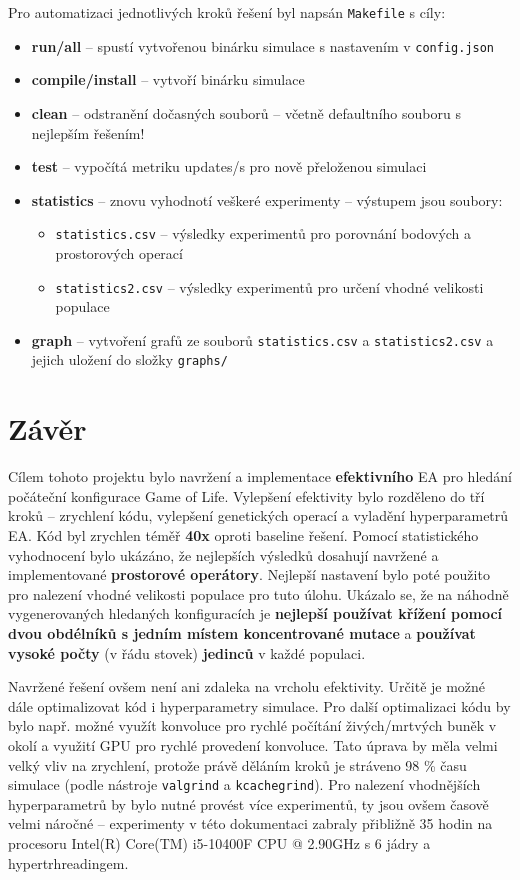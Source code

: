 \documentclass[12pt]{article}
\begin{document}
Pro automatizaci jednotlivých kroků řešení byl napsán \texttt{Makefile} s cíly:
\begin{itemize}
    \item \textbf{run/all} -- spustí vytvořenou binárku simulace s nastavením v \texttt{config.json}
    \item \textbf{compile/install} -- vytvoří binárku simulace
    \item \textbf{clean} -- odstranění dočasných souborů -- včetně defaultního souboru s nejlepším řešením!
    \item \textbf{test} -- vypočítá metriku updates/s pro nově přeloženou simulaci
    \item \textbf{statistics} -- znovu vyhodnotí veškeré experimenty -- výstupem jsou soubory:
       \begin{itemize}
           \item \texttt{statistics.csv} -- výsledky experimentů pro porovnání bodových a prostorových operací
           \item \texttt{statistics2.csv} -- výsledky experimentů pro určení vhodné velikosti populace  
       \end{itemize}
    \item \textbf{graph} -- vytvoření grafů ze souborů \texttt{statistics.csv} a  \texttt{statistics2.csv} a jejich uložení do složky \texttt{graphs/}
\end{itemize}

\section{Závěr}
Cílem tohoto projektu bylo navržení a implementace \textbf{efektivního} EA pro hledání počáteční konfigurace Game of Life. Vylepšení efektivity bylo rozděleno do tří kroků -- zrychlení kódu, vylepšení genetických operací a vyladění hyperparametrů EA. Kód byl zrychlen téměř \textbf{40x} oproti baseline řešení. Pomocí statistického vyhodnocení bylo ukázáno, že nejlepších výsledků dosahují navržené a implementované \textbf{prostorové operátory}. Nejlepší nastavení bylo poté použito pro nalezení vhodné velikosti populace pro tuto úlohu. Ukázalo se, že na náhodně vygenerovaných hledaných konfiguracích je \textbf{nejlepší používat křížení pomocí dvou obdélníků s jedním místem koncentrované mutace} a \textbf{používat vysoké počty} (v řádu stovek) \textbf{jedinců} v každé populaci.

Navržené řešení ovšem není ani zdaleka na vrcholu efektivity. Určitě je možné dále optimalizovat kód i hyperparametry simulace. Pro další optimalizaci kódu by bylo např. možné využít konvoluce pro rychlé počítání živých/mrtvých buněk v okolí a využití GPU pro rychlé provedení konvoluce. Tato úprava by měla velmi velký vliv na zrychlení, protože právě děláním kroků je stráveno 98 \% času simulace (podle nástroje \texttt{valgrind} a \texttt{kcachegrind}). Pro nalezení vhodnějších hyperparametrů by bylo nutné provést více experimentů, ty jsou ovšem časově velmi náročné -- experimenty v této dokumentaci zabraly přibližně 35 hodin na procesoru Intel(R) Core(TM) i5-10400F CPU @ 2.90GHz s 6 jádry a hypertrhreadingem.
\end{document}
